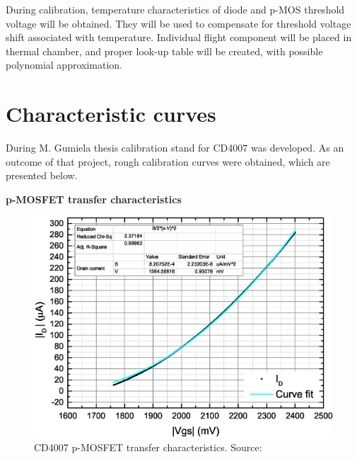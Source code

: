     During calibration, temperature characteristics of diode and p-MOS threshold voltage will be obtained. They will be used to compensate for threshold voltage shift associated with temperature. Individual flight component will be placed in thermal chamber, and proper look-up table will be created, with possible polynomial approximation.


\section{Characteristic curves}
\label{Characteristic_curves}

    During M. Gumiela thesis \cite{MGThesis} calibration stand for CD4007 was developed. As an outcome of that project, rough calibration curves were obtained, which are presented below.

    \bigskip \textbf{p-MOSFET transfer characteristics}
    \begin{figure}[H]
        \centering
        \includegraphics[width=0.7\paperwidth]{img/05/mg_iv_mosfet.eps}
        \caption{CD4007 p-MOSFET transfer characteristics. Source: \cite{MGThesis}}
        \label{CD4007_p-MOSFET_transfer}
    \end{figure}

